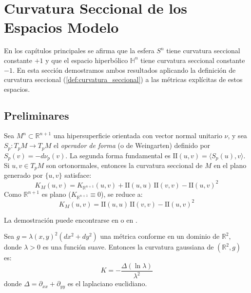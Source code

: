\section{Curvatura Seccional de los Espacios Modelo}\label{sec:curvatura_espacios_modelo}

En los capítulos principales se afirma que la esfera $S^n$ tiene curvatura seccional constante $+1$ y que el espacio hiperbólico $\mathbb{H}^n$ tiene curvatura seccional constante $-1$. En esta sección demostramos ambos resultados aplicando la definición de curvatura seccional (\autoref{def:curvatura_seccional}) a las métricas explícitas de estos espacios.

\subsection{Preliminares}\label{subsec:curvatura_espacios_preliminares}

\begin{lemma}\label{lem:ecuacion_gauss}
Sea $M^n \subset \mathbb{R}^{n+1}$ una hipersuperficie orientada con vector normal unitario $\nu$, y sea $S_p: T_pM \to T_pM$ el \textit{operador de forma} (o de Weingarten) definido por $S_p(v) = -d\nu_p(v)$. La segunda forma fundamental es $\mathrm{II}(u, v) = \langle S_p(u), v \rangle$. Si $u, v \in T_pM$ son ortonormales, entonces la curvatura seccional de $M$ en el plano generado por $\{u, v\}$ satisface:
\begin{equation}\label{eq:ecuacion_gauss}
K_M(u,v) = K_{\mathbb{R}^{n+1}}(u,v) + \mathrm{II}(u,u)\,\mathrm{II}(v,v) - \mathrm{II}(u,v)^2
\end{equation}
Como $\mathbb{R}^{n+1}$ es plano ($K_{\mathbb{R}^{n+1}} \equiv 0$), se reduce a:
\begin{equation}\label{eq:gauss_simplificada}
K_M(u,v) = \mathrm{II}(u,u)\,\mathrm{II}(v,v) - \mathrm{II}(u,v)^2
\end{equation}
\end{lemma}

La demostración puede encontrarse en \citet[Teorema~8.4]{lee2018introduction} o en \citet[Capítulo~3, Proposición~4]{do1976differential}.

\begin{lemma}\label{lem:curvatura_conforme_2d}
Sea $g = \lambda(x,y)^2(dx^2 + dy^2)$ una métrica conforme en un dominio de $\mathbb{R}^2$, donde $\lambda > 0$ es una función suave. Entonces la curvatura gaussiana de $(\mathbb{R}^2, g)$ es:
\begin{equation}\label{eq:curvatura_conforme}
K = -\frac{\Delta(\ln \lambda)}{\lambda^2}
\end{equation}
donde $\Delta = \partial_{xx} + \partial_{yy}$ es el laplaciano euclidiano.
\end{lemma}

